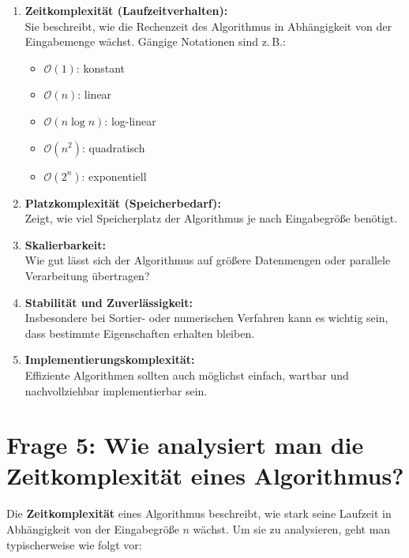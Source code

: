 \documentclass{article}
\begin{document}
		\begin{enumerate}
			\item \textbf{Zeitkomplexität (Laufzeitverhalten):} \\
			Sie beschreibt, wie die Rechenzeit des Algorithmus in Abhängigkeit von der Eingabemenge wächst. Gängige Notationen sind z.\,B.:
			\begin{itemize}
				\item \( \mathcal{O}(1) \): konstant
				\item \( \mathcal{O}(n) \): linear
				\item \( \mathcal{O}(n \log n) \): log-linear
				\item \( \mathcal{O}(n^2) \): quadratisch
				\item \( \mathcal{O}(2^n) \): exponentiell
			\end{itemize}
			
			\item \textbf{Platzkomplexität (Speicherbedarf):} \\
			Zeigt, wie viel Speicherplatz der Algorithmus je nach Eingabegröße benötigt.
			
			\item \textbf{Skalierbarkeit:} \\
			Wie gut lässt sich der Algorithmus auf größere Datenmengen oder parallele Verarbeitung übertragen?
			
			\item \textbf{Stabilität und Zuverlässigkeit:} \\
			Insbesondere bei Sortier- oder numerischen Verfahren kann es wichtig sein, dass bestimmte Eigenschaften erhalten bleiben.
			
			\item \textbf{Implementierungskomplexität:} \\
			Effiziente Algorithmen sollten auch möglichst einfach, wartbar und nachvollziehbar implementierbar sein.
		\end{enumerate}
		
		
\section*{Frage 5: Wie analysiert man die Zeitkomplexität eines Algorithmus?}

Die \textbf{Zeitkomplexität} eines Algorithmus beschreibt, wie stark seine Laufzeit in Abhängigkeit von der Eingabegröße \( n \) wächst. Um sie zu analysieren, geht man typischerweise wie folgt vor:
\end{document}
